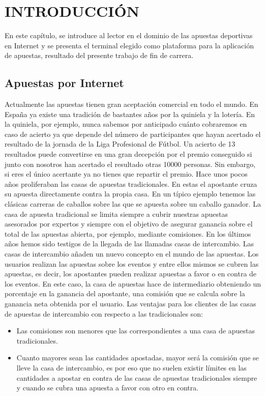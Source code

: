 \chapter{INTRODUCCIÓN}
\label{ch:intro}

En este capítulo, se introduce al lector en el dominio de las apuestas deportivas en Internet y se presenta el terminal elegido como plataforma para la aplicación de apuestas, resultado del presente trabajo de fin de carrera.

\section{Apuestas por Internet}

Actualmente las apuestas tienen gran aceptación comercial en todo el mundo. En España ya existe una tradición de bastantes años por la quiniela y la lotería. En la quiniela, por ejemplo, nunca sabemos por anticipado cuánto cobraremos en caso de acierto ya que depende del número de participantes que hayan acertado el resultado de la jornada de la Liga Profesional de Fútbol. Un acierto de 13 resultados puede convertirse en una gran decepción por el premio conseguido si junto con nosotros han acertado el resultado otras 10000 personas. Sin embargo, si eres el único acertante ya no tienes que repartir el premio. 
 Hace unos pocos años proliferaban las casas de apuestas tradicionales. En estas el apostante cruza su apuesta directamente contra la propia casa. En un típico ejemplo tenemos las clásicas carreras de caballos sobre las que se apuesta sobre un caballo ganador. La casa de apuesta tradicional se limita siempre a cubrir nuestras apuestas asesorados por expertos y siempre con el objetivo de asegurar ganancia sobre el total de las apuestas abierta, por ejemplo, mediante comisiones. 
En los últimos años hemos sido testigos de la llegada de las llamadas casas de intercambio. 
Las casas de intercambio añaden un nuevo concepto en el mundo de las apuestas. Los usuarios realizan las apuestas sobre los eventos y entre ellos mismos se cubren las apuestas, es decir, los apostantes pueden realizar apuestas a favor o en contra de los eventos. 
 En este caso, la casa de apuestas hace de intermediario obteniendo un porcentaje en la ganancia del apostante, una comisión que se calcula sobre la ganancia neta obtenida por el usuario.
 Las ventajas para los clientes de las casas de apuestas de intercambio con respecto a las tradicionales son:
\begin{itemize}
	\item Las comisiones son menores que las correspondientes a una casa de apuestas tradicionales.
	\item Cuanto mayores sean las cantidades apostadas, mayor será la comisión que se lleve la casa de intercambio, es por eso que no suelen existir límites en las cantidades a apostar en contra de las casas de apuestas tradicionales siempre y cuando se cubra una apuesta a favor con otro en contra.
\end{itemize}
